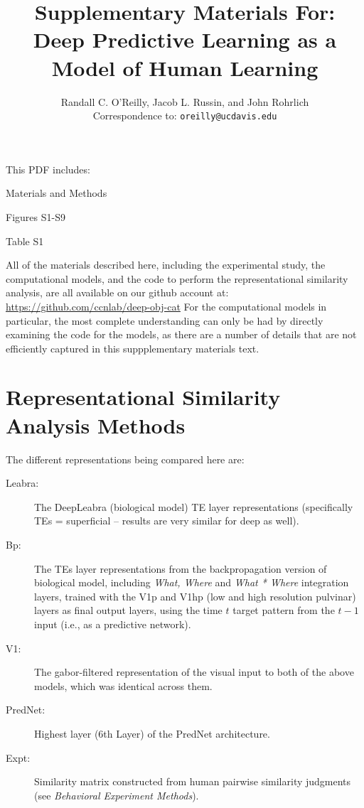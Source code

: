 \documentclass[12pt,twoside]{article}
\title{ Supplementary Materials For:\\
Deep Predictive Learning as a Model of Human Learning }
\author{Randall C. O'Reilly, Jacob L. Russin, and John Rohrlich\\
  Correspondence to: \texttt{oreilly@ucdavis.edu}\\}
\newif\myifpdf
\begin{document}
\sloppy
\raggedbottom

\maketitle 

\noindent This PDF includes:
\begin{description}
\item Materials and Methods
\item Figures S1-S9
\item Table S1
\end{description}

\clearpage

\pagestyle{myheadings}

All of the materials described here, including the experimental study, the computational models, and the code to perform the representational similarity analysis, are all available on our github account at: \url{https://github.com/ccnlab/deep-obj-cat}  For the computational models in particular, the most complete understanding can only be had by directly examining the code for the models, as there are a number of details that are not efficiently captured in this suppplementary materials text.

\section{Representational Similarity Analysis Methods}

The different representations being compared here are:
\begin{description}
\item[Leabra:] The DeepLeabra (biological model) TE layer representations (specifically TEs = superficial -- results are very similar for deep as well).
\item[Bp:] The TEs layer representations from the backpropagation version of biological model, including {\em What, Where} and {\em What * Where} integration layers, trained with the V1p and V1hp (low and high resolution pulvinar) layers as final output layers, using the time $t$ target pattern from the $t-1$ input (i.e., as a predictive network).
\item[V1:] The gabor-filtered representation of the visual input to both of the above models, which was identical across them.
\item[PredNet:] Highest layer (6th Layer) of the PredNet architecture.

\item[Expt:] Similarity matrix constructed from human pairwise similarity judgments (see {\em Behavioral Experiment Methods}).
\end{description}
\end{document}
